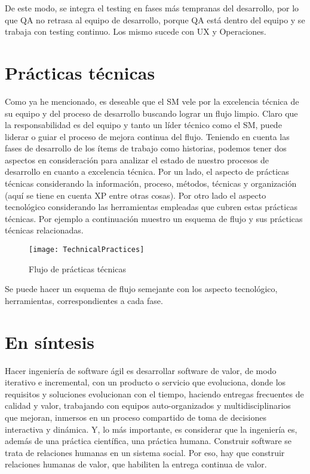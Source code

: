 De este modo, se integra el testing en fases más tempranas del desarrollo, por lo que QA no retrasa al equipo de desarrollo, porque QA está dentro del equipo y se trabaja con testing continuo. Los mismo sucede con UX y Operaciones.

\section{Prácticas técnicas}

Como ya he mencionado, es deseable que el SM vele por la excelencia técnica de su equipo y del proceso de desarrollo buscando lograr un flujo limpio. Claro que la responsabilidad es del equipo y tanto un líder técnico como el SM, puede liderar o guiar el proceso de mejora continua del flujo. Teniendo en cuenta las fases de desarrollo de los ítems de trabajo como historias, podemos tener dos aspectos en consideración para analizar el estado de nuestro procesos de desarrollo en cuanto a excelencia técnica. Por un lado, el aspecto de prácticas técnicas considerando la información, proceso, métodos, técnicas y organización (aquí se tiene en cuenta XP entre otras cosas). Por otro lado el aspecto tecnológico considerando las herramientas empleadas que cubren estas prácticas técnicas. Por ejemplo a continuación muestro un esquema de flujo y sus prácticas técnicas relacionadas.

\begin{figure}[h]
  \centering
  \texttt{[image: TechnicalPractices]}
  \caption{Flujo de prácticas técnicas}
  \centering
  \label{fig:TechnicalPractices} %
\end{figure}

Se puede hacer un esquema de flujo semejante con los aspecto tecnológico, herramientas, correspondientes a cada fase.

\section{En síntesis}

Hacer ingeniería de software ágil es desarrollar software de valor, de modo iterativo e incremental, con un producto o servicio que evoluciona, donde los requisitos y soluciones evolucionan con el tiempo, haciendo entregas frecuentes de calidad y valor, trabajando con equipos auto-organizados y multidisciplinarios que mejoran, inmersos en un proceso compartido de toma de decisiones interactiva y dinámica. Y, lo más importante, es considerar que la ingeniería es, además de una práctica científica, una práctica humana. Construir software se trata de relaciones humanas en un sistema social. Por eso, hay que construir relaciones humanas de valor, que habiliten la entrega continua de valor.
